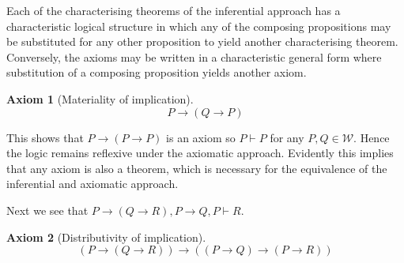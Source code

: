 \documentclass{amsbook}
\newcommand{\infers}{\mathrel\vdash}
\newcommand{\then}{\mathrel\rightarrow}
\theoremstyle{definition}
\newtheorem{axm}{Axiom}[section]
\begin{document}
Each of the characterising theorems of the inferential approach has a characteristic logical structure in which any of the composing propositions may be substituted for any other proposition to yield another characterising theorem. Conversely, the axioms may be written in a characteristic general form where substitution of a composing proposition yields another axiom.

\begin{axm}[Materiality of implication]
    $$P \then (Q \then P)$$
\end{axm}

This shows that $P \then (P \then P)$ is an axiom so $P \infers P$ for any $P, Q \in \mathcal W$. Hence the logic remains reflexive under the axiomatic approach. Evidently this implies that any axiom is also a theorem, which is necessary for the equivalence of the inferential and axiomatic approach.

Next we see that $P \then (Q \then R), P \then Q, P \infers R$.

\begin{axm}[Distributivity of implication]
    $$(P \then (Q \then R)) \then ((P \then Q) \then (P \then R))$$
\end{axm}
\end{document}
